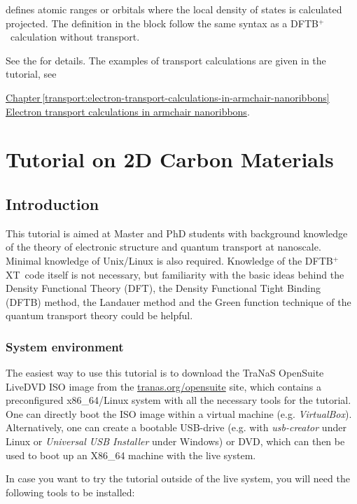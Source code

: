 \documentclass[a4paper,11pt,english]{sphinxmanual}
\newcommand{\dftbp}{\textsf{DFTB$^{\text{+}}$\ }} %
\newcommand{\dftbpxt}{\textsf{DFTB$^{\text{+}}$XT\ }} %
\newcommand{\is}[1]{{\sffamily{#1}}}
\begin{document}
{\is{Region} defines atomic ranges or orbitals where the local density of states is calculated projected. The definition in the block follow the same syntax as a \dftbp calculation without transport.

See the \is{USER MANUAL} for details. The examples of transport calculations are given in the tutorial, see   {\hyperref[transport:electron-transport-calculations-in-armchair-nanoribbons]{Chapter\,\ref{transport:electron-transport-calculations-in-armchair-nanoribbons} Electron transport calculations in armchair nanoribbons}.

\part{Tutorial on 2D Carbon Materials}
\label{2Dtutorial}    

\chapter{Introduction}
\label{introduction:dftb-tutorial-on-2d-carbon-materials}\label{introduction:introduction}\label{introduction::doc}
This tutorial is aimed at Master and PhD students with
background knowledge of the theory of electronic structure and quantum
transport at nanoscale. Minimal knowledge of Unix/Linux is also
required. Knowledge of the \dftbpxt code itself is not necessary, but
familiarity with the basic ideas behind the Density Functional Theory (DFT), the Density Functional Tight
Binding (DFTB) method, the Landauer method and the Green function technique of the quantum transport theory could be helpful.


\section{System environment}
\label{introduction:system-environment}
The easiest way to use this tutorial is to download the {\textsf{TraNaS OpenSuite LiveDVD}} ISO
image from the \href{http://tranas.org/opensuite}{tranas.org/opensuite} site, which contains a preconfigured x86\_64/Linux system with all the
necessary tools for the tutorial. One can directly boot the ISO image
within a virtual machine (e.g. \emph{VirtualBox}). Alternatively, one can
create a bootable USB-drive (e.g. with \emph{usb-creator} under Linux or
\emph{Universal USB Installer} under Windows) or DVD, which can then be
used to boot up an X86\_64 machine with the live system.

In case you want to try the tutorial outside of the live system, you
will need the following tools to be installed:

}}
\end{document}
